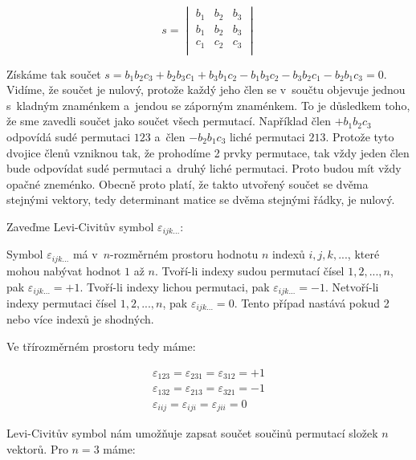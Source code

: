 \begin{equation}
s = 
\begin{vmatrix}
b_1 & b_2 & b_3 \\
b_1 & b_2 & b_3 \\
c_1 & c_2 & c_3 \\
\end{vmatrix}
\end{equation}

Získáme tak součet \(s = b_1 b_2 c_3 + b_2 b_3 c_1 + b_3 b_1 c_2 - b_1 b_3 c_2  - b_3 b_2 c_1 - b_2 b_1 c_3 = 0\). Vidíme, že součet je nulový, protože každý jeho člen se v~součtu objevuje jednou s~kladným znaménkem a~jendou se záporným znaménkem. To je důsledkem toho, že sme zavedli součet jako součet všech permutací. Například člen \(+b_1 b_2 c_3\) odpovídá sudé permutaci \(123\) a~člen \(-b_2 b_1 c_3\) liché permutaci \(213\). Protože tyto dvojice členů vzniknou tak, že prohodíme 2 prvky permutace, tak vždy jeden člen bude odpovídat sudé permutaci a~druhý liché permutaci. Proto budou mít vždy opačné zneménko. Obecně proto platí, že takto utvořený součet se dvěma stejnými vektory, tedy determinant matice se dvěma stejnými řádky, je nulový.

Zaveďme Levi-Civitův symbol \(\varepsilon_{ijk...}\):

\begin{fact}
Symbol \(\varepsilon_{ijk...}\) má v~\(n\)-rozměrném prostoru hodnotu \(n\) indexů \(i, j, k, ...\), které mohou nabývat hodnot \(1\) až \(n\). Tvoří-li indexy sudou permutací čísel \(1, 2, ..., n\), pak \(\varepsilon_{ijk...} = +1\). Tvoří-li indexy lichou permutaci, pak \(\varepsilon_{ijk...} = -1\). Netvoří-li indexy permutaci čísel \(1, 2, ..., n\), pak \(\varepsilon_{ijk...} = 0\). Tento případ nastává pokud 2 nebo více indexů je shodných.
\end{fact}

Ve třírozměrném prostoru tedy máme:

\begin{equation}
\begin{split}
\varepsilon_{123} = \varepsilon_{231} = \varepsilon_{312} = +1 \\
\varepsilon_{132} = \varepsilon_{213} = \varepsilon_{321} = -1 \\
\varepsilon_{iij} = \varepsilon_{iji} = \varepsilon_{jii} = 0
\end{split}
\end{equation}

Levi-Civitův symbol nám umožňuje zapsat součet součinů permutací složek \(n\) vektorů. Pro \(n = 3\) máme:

